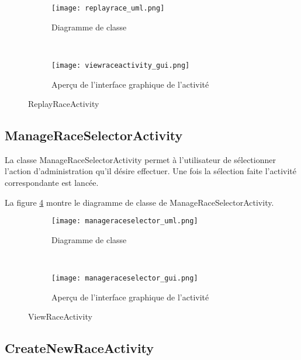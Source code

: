 \begin{figure}[htb!]
    \centering
    \begin{subfigure}[htb]{0.49\textwidth}
		\texttt{[image: replayrace\_uml.png]} 
		\caption{Diagramme de classe}
		\label{fig:replayrace_uml}
    \end{subfigure}
    ~ %
    \begin{subfigure}[htb]{0.49\textwidth}
		\texttt{[image: viewraceactivity\_gui.png]} 
		\caption{Aperçu de l'interface graphique de l'activité}
		\label{fig:replayrace_gui}
    \end{subfigure}
    \caption{ReplayRaceActivity}\label{fig:replayrace_fig}
\end{figure}


\subsection{ManageRaceSelectorActivity}

La classe ManageRaceSelectorActivity permet à l'utilisateur de sélectionner l'action d'administration qu'il désire effectuer. Une fois la sélection  faite l'activité correspondante est lancée.

La figure \ref{fig:manageraceselector_uml} montre le diagramme de classe de ManageRaceSelectorActivity.

\begin{figure}[htb!]
    \centering
    \begin{subfigure}[htb]{0.49\textwidth}
		\texttt{[image: manageraceselector\_uml.png]} 
		\caption{Diagramme de classe}
		\label{fig:manageraceselector_uml}
    \end{subfigure}
    ~ %
    \begin{subfigure}[htb]{0.49\textwidth}
		\texttt{[image: manageraceselector\_gui.png]} 
		\caption{Aperçu de l'interface graphique de l'activité}
		\label{fig:manageraceselector_gui}
    \end{subfigure}
    \caption{ViewRaceActivity}\label{fig:manageraceselector_fig}
\end{figure}

\subsection{CreateNewRaceActivity}

